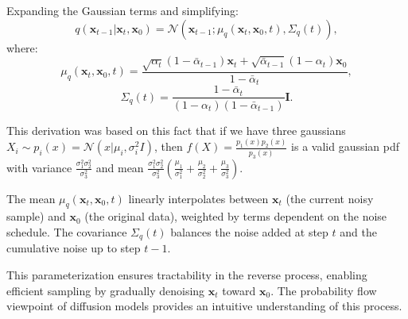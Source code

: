 \documentclass{article}
\begin{document}
Expanding the Gaussian terms and simplifying:
\[
q(\mathbf{x}_{t-1} | \mathbf{x}_t, \mathbf{x}_0) = \mathcal{N}(\mathbf{x}_{t-1}; \mu_q(\mathbf{x}_t, \mathbf{x}_0, t), \Sigma_q(t)),
\]
where:
\[
\mu_q(\mathbf{x}_t, \mathbf{x}_0, t) = 
\frac{\sqrt{\alpha_t} (1 - \bar{\alpha}_{t-1}) \mathbf{x}_t + \sqrt{\bar{\alpha}_{t-1}} (1 - \alpha_t) \mathbf{x}_0}{1 - \bar{\alpha}_t},
\]
\[
\Sigma_q(t) = \frac{1 - \bar{\alpha}_{t}}{(1 - \alpha_t)(1 - \bar{\alpha}_{t-1})} \mathbf{I}.
\]

This derivation was based on this fact that if we have three gaussians $X_i \sim p_i(x) = \mathcal{N}(x| \mu_i, \sigma_i^2 I)$, then $f(X) = \frac{p_1(x) p_2(x)}{p_3(x)}$ is a valid gaussian pdf with variance $\frac{\sigma_1^2\sigma_2^2}{\sigma_3^2}$ and mean $\frac{\sigma_1^2\sigma_2^2}{\sigma_3^2} (\frac{\mu_1}{\sigma_1^2} + \frac{\mu_2}{\sigma_2^2} + \frac{\mu_3}{\sigma_3^2})$.

The mean $\mu_q(\mathbf{x}_t, \mathbf{x}_0, t)$ linearly interpolates between $\mathbf{x}_t$ (the current noisy sample) and $\mathbf{x}_0$ (the original data), weighted by terms dependent on the noise schedule. The covariance $\Sigma_q(t)$ balances the noise added at step $t$ and the cumulative noise up to step $t-1$. 

This parameterization ensures tractability in the reverse process, enabling efficient sampling by gradually denoising $\mathbf{x}_t$ toward $\mathbf{x}_0$. The probability flow viewpoint of diffusion models provides an intuitive understanding of this process.
\end{document}
